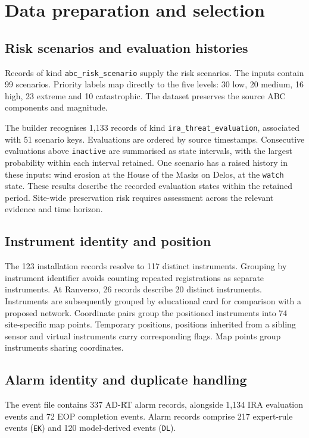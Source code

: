 \documentclass[10pt,a4paper]{article}
\begin{document}
\section{Data preparation and selection}
\subsection{Risk scenarios and evaluation histories}
Records of kind \texttt{abc\_risk\_scenario} supply the risk scenarios. The inputs contain 99 scenarios. Priority labels map directly to the five levels: 30 low, 20 medium, 16 high, 23 extreme and 10 catastrophic. The dataset preserves the source ABC components and magnitude.

The builder recognises 1,133 records of kind \texttt{ira\_threat\_evaluation}, associated with 51 scenario keys. Evaluations are ordered by source timestamps. Consecutive evaluations above \texttt{inactive} are summarised as state intervals, with the largest probability within each interval retained. One scenario has a raised history in these inputs: wind erosion at the House of the Masks on Delos, at the \texttt{watch} state. These results describe the recorded evaluation states within the retained period. Site-wide preservation risk requires assessment across the relevant evidence and time horizon.

\subsection{Instrument identity and position}
The 123 installation records resolve to 117 distinct instruments. Grouping by instrument identifier avoids counting repeated registrations as separate instruments. At Ranverso, 26 records describe 20 distinct instruments. Instruments are subsequently grouped by educational card for comparison with a proposed network. Coordinate pairs group the positioned instruments into 74 site-specific map points. Temporary positions, positions inherited from a sibling sensor and virtual instruments carry corresponding flags. Map points group instruments sharing coordinates.

\subsection{Alarm identity and duplicate handling}
The event file contains 337 AD-RT alarm records, alongside 1,134 IRA evaluation events and 72 EOP completion events. Alarm records comprise 217 expert-rule events (\texttt{EK}) and 120 model-derived events (\texttt{DL}).
\end{document}

